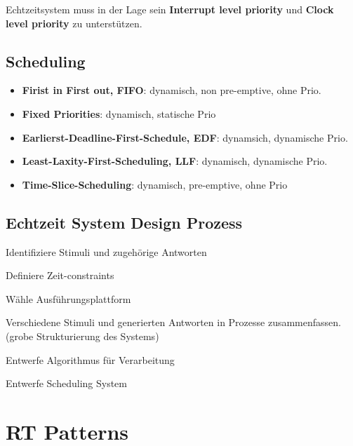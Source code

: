Echtzeitsystem muss in der Lage sein \textbf{Interrupt level priority} und \textbf{Clock level priority}
zu unterstützen.


\subsection{Scheduling}
\begin{itemize}
    \item \textbf{Firist in First out, FIFO}: dynamisch, non pre-emptive, ohne Prio.
    \item \textbf{Fixed Priorities}: dynamisch, statische Prio
    \item \textbf{Earlierst-Deadline-First-Schedule, EDF}: dynamsich, dynamische Prio.
    \item \textbf{Least-Laxity-First-Scheduling, LLF}: dynamisch, dynamische Prio.
    \item \textbf{Time-Slice-Scheduling}: dynamisch, pre-emptive, ohne Prio
\end{itemize}


\subsection{Echtzeit System Design Prozess}
\begin{compactenum}
    \item Identifiziere Stimuli und zugehörige Antworten
    \item Definiere Zeit-constraints
    \item Wähle Ausführungsplattform
    \item Verschiedene Stimuli und generierten Antworten in Prozesse zusammenfassen. (grobe Strukturierung des Systems)
    \item Entwerfe Algorithmus für Verarbeitung
    \item Entwerfe Scheduling System
\end{compactenum}


\section{RT Patterns}
